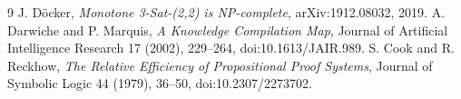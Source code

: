 \documentclass[11pt]{article}
\begin{document}
\begin{thebibliography}{9}
 J. D\"ocker, \emph{Monotone 3-Sat-(2,2) is NP-complete},
arXiv:1912.08032, 2019.
 A. Darwiche and P. Marquis, \emph{A Knowledge Compilation Map},
Journal of Artificial Intelligence Research 17 (2002), 229--264,
doi:10.1613/JAIR.989.
 S. Cook and R. Reckhow, \emph{The Relative Efficiency of
Propositional Proof Systems}, Journal of Symbolic Logic 44 (1979), 36--50,
doi:10.2307/2273702.
\end{thebibliography}
\end{document}
